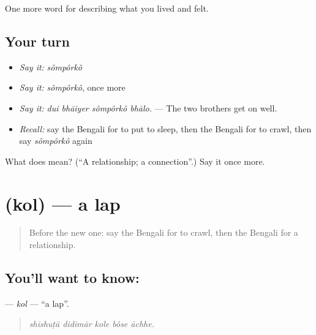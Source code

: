 \begin{grammarlens}[title={What you've built}]
One more word for describing what you lived and felt.
\end{grammarlens}

\subsection*{Your turn}
\begin{itemize}
\raggedright
  \item \emph{Say it:} \emph{sômpôrkô}
  \item \emph{Say it:} \emph{sômpôrkô}, once more
  \item \emph{Say it:} \emph{dui bhāiyer sômpôrkô bhālo.} — The two brothers get on well.
  \item \emph{Recall:} say the Bengali for to put to sleep, then the Bengali for to crawl, then say \emph{sômpôrkô} again
\end{itemize}

\begin{tcolorbox}[breakable,colback=teal!4,colframe=teal!35!black,title={Before you move on}]
What does  mean? (\textquotedblleft{}A relationship; a connection\textquotedblright{}.) Say it once more.
\end{tcolorbox}
\section[\texorpdfstring{\bn{কোল} (kol)}{কোল (kol)}]{ (kol) — a lap}

\label{lesson:BN-C487-kol}



\begin{quote}
Before the new one: say the Bengali for to crawl, then the Bengali for a relationship.
\end{quote}

\subsection*{You'll want to know: }
\textbf{} — \emph{kol} — \textquotedblleft{}a lap\textquotedblright{}.

\begin{quote}
    
\end{quote}

\begin{quote}
\emph{shishuṭā didimār kole bôse āchhe.}
\end{quote}

